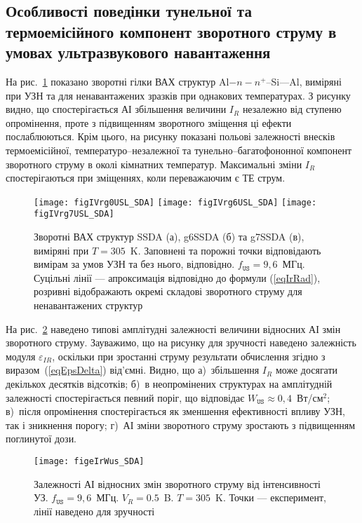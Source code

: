 \subsection{Особливості поведінки тунельної та термоемісійного компонент зворотного струму в умовах ультразвукового навантаження}

На рис.~\ref{figIVrg0USL_SDA} показано зворотні гілки ВАХ структур Al$-n-n^+$--Si---Al, виміряні при УЗН та для ненавантажених
зразків при однакових температурах.
З рисунку видно, що спостерігається АІ збільшення величини $I_R$ незалежно від ступеню опромінення, проте з підвищенням зворотного
зміщення ці ефекти послаблюються.
Крім цього, на рисунку показані польові залежності внесків термоемісійної, температуро--незалежної та тунельно--багатофононної компонент
зворотного струму в околі кімнатних температур.
Максимальні зміни $I_R$ спостерігаються при зміщеннях, коли переважаючим є ТЕ струм.


\begin{figure}
\center
\texttt{[image: figIVrg0USL\_SDA]}
\texttt{[image: figIVrg6USL\_SDA]}
\texttt{[image: figIVrg7USL\_SDA]}
\caption{\label{figIVrg0USL_SDA}
Зворотні  ВАХ  структур SSDA (а), g6SSDA (б) та g7SSDA (в), виміряні при $T=305$~K.
Заповнені та порожні точки відповідають вимірам за умов УЗН та без нього, відповідно.
$f_\mathtt{US}=9,6$~МГц.
Суцільні лінії --- апроксимація відповідно до формули (\ref{eqIrRad}),
розривні відображають окремі складові зворотного струму для ненавантажених структур
}%
\end{figure}



На рис.~\ref{figeIrWus_SDA} наведено типові амплітудні залежності величини відносних АІ змін зворотного струму.
Зауважимо, що на рисунку для зручності наведено залежність модуля $\varepsilon_{IR}$, оскільки при зростанні струму результати обчислення згідно з виразом~(\ref{eqEpsDelta}) від'ємні.
Видно, що
а)~збільшення $I_R$ може досягати декількох десятків відсотків;
б)~в неопромінених структурах на амплітудній залежності спостерігається певний поріг, що відповідає $W_\mathtt{US}\approx0,4$~Вт/см$^2$;
в)~після опромінення спостерігається як зменшення ефективності впливу УЗН, так і зникнення порогу;
г)~АІ зміни зворотного струму зростають з підвищенням поглинутої дози.


\begin{figure}
\center
\texttt{[image: figeIrWus\_SDA]}
\caption{\label{figeIrWus_SDA}
Залежності АІ відносних змін зворотного струму від інтенсивності УЗ.
$f_\mathtt{US}=9,6$~МГц.
$V_R=0.5$~B. $T=305$~K.
Точки --- експеримент,
лінії наведено для зручності
}%
\end{figure}

